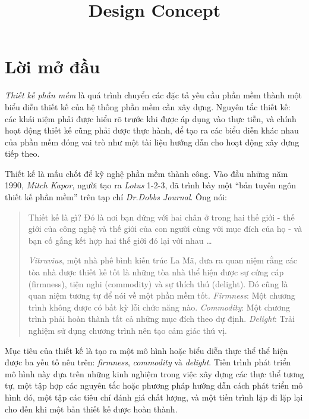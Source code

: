 \documentclass[12pt, a4paper]{article}
\title{Design Concept}
\begin{document}
	
	\clearpage
	
	\tableofcontents 
	\clearpage
	
	\listoffigures
	
	\listoftables
	
	\printglossary[type=\acronymtype, title=Thuật ngữ viết tắt]
	\clearpage
	
	\section*{Lời mở đầu}
	\textit{Thiết kế phần mềm} là quá trình chuyển các đặc tả yêu cầu phần mềm thành một biểu diễn thiết kế của hệ thống phần mềm cần xây dựng. Nguyên tắc thiết kế: các khái niệm phải được hiểu rõ trước khi được áp dụng vào thực tiễn, và chính hoạt động thiết kế cũng phải được thực hành, để tạo ra các biểu diễn khác nhau của phần mềm đóng vai trò như một tài liệu hướng dẫn cho hoạt động xây dựng tiếp theo.
	
	
	
	Thiết kế là mấu chốt để kỹ nghệ phần mềm thành công. Vào đầu những năm 1990,\textit{ Mitch Kapor}, người tạo ra \textit{Lotus} 1-2-3, đã trình bày một “bản tuyên ngôn thiết kế phần mềm” trên tạp chí \textit{Dr.Dobbs Journal}. Ông nói:
	
	
	\begin{quotation}
	Thiết kế là gì? Đó là nơi bạn đứng với hai chân ở trong hai thế giới - thế giới của công nghệ và thế giới của con người  cùng với  mục đích của họ - và bạn cố gắng kết hợp hai thế giới đó lại với nhau \ldots
		
		
		\textit{Vitruvius}, một nhà phê bình kiến trúc La Mã, đưa ra quan niệm rằng các tòa nhà được thiết kế tốt là những tòa nhà thể hiện được sự cứng cáp (firmness), tiện nghi (commodity) và sự thích thú (delight). Đó cũng là quan niệm tương tự để nói về một phần mềm tốt.\textit{ Firmness}: Một chương trình không được có bất kỳ lỗi chức năng nào. \textit{Commodity}: Một chương trình phải hoàn thành tất cả những mục đích theo dự định. \textit{Delight}: Trải nghiệm sử dụng chương trình nên tạo cảm giác thú vị. 
		
	\end{quotation}	
	
	Mục tiêu của thiết kế là tạo ra một mô hình hoặc biểu diễn thực thể thể hiện được ba yếu tố nêu trên: \textit{firmness}, \textit{commodity} và \textit{delight}. Tiến trình phát triển mô hình này dựa trên những kinh nghiệm trong việc xây dựng các thực thể tương tự, một tập hợp các nguyên tắc hoặc phương pháp hướng dẫn cách phát triển mô hình đó, một tập các tiêu chí đánh giá chất lượng, và một tiến trình lặp đi lặp lại cho đến khi một bản thiết kế được hoàn thành.
	
\end{document}
